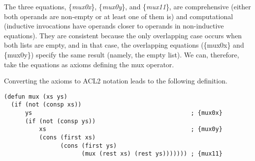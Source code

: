 \label{def:mux}
The three equations, \{\emph{mux0x}\}, \{\emph{mux0y}\}, and \{\emph{mux11}\},
are comprehensive (either both operands are non-empty
or at least one of them is) and computational
(inductive invocations have operands closer to operands in non-inductive equations).
They are consistent because the only overlapping case
occurs when both lists are empty, and in that case,
the overlapping equations
(\{mux0x\} and \{mux0y\}) specify the same result
(namely, the empty list).
We can, therefore, take the equations as axioms
defining the mux operator.

Converting the axioms to ACL2 notation leads to the following
definition.

\label{mux-defun}
\begin{Verbatim}
(defun mux (xs ys)
  (if (not (consp xs))
      ys                                             ; {mux0x}
      (if (not (consp ys))
          xs                                         ; {mux0y}
          (cons (first xs)
                (cons (first ys)
                      (mux (rest xs) (rest ys))))))) ; {mux11}
\end{Verbatim}

